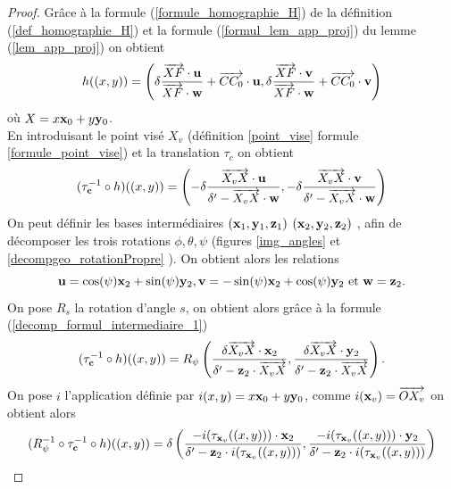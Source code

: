\begin{proof}
Grâce à la formule (\ref{formule_homographie_H}) de la définition (\ref{def_homographie_H}) et la formule  (\ref{formul_lem_app_proj}) du lemme (\ref{lem_app_proj}) on obtient
\begin{equation*}
h((x,y))=\left( \delta \frac{\overrightarrow{XF}\cdot \mathbf{u}}{\overrightarrow{XF} \cdot \mathbf{w}} +\overrightarrow{CC_0 } \cdot \mathbf{u}, \delta \frac{\overrightarrow{XF}\cdot \mathbf{v}}{\overrightarrow{XF} \cdot  \mathbf{w}}+\overrightarrow{CC_0 }\cdot \mathbf{v} \right)
\end{equation*}
où $X=x \mathbf{x}_0 + y \mathbf{y}_0 $.\\
En introduisant le point visé $X_v$ (définition \ref{point_vise} formule \ref{formule_point_vise}) et la translation $\tau_c$ on obtient 
\begin{equation}
(\tau_{\mathbf{c}}^{-1} \circ h)((x,y)) = \left ( -\delta \frac{\overrightarrow{X_vX}\cdot \mathbf{u}}{\delta' -\overrightarrow{X_vX} \cdot \mathbf{w}},-\delta \frac{\overrightarrow{X_vX}\cdot \mathbf{v}}{\delta' -\overrightarrow{X_vX} \cdot \mathbf{w}} \right)
\label{decomp_formul_intermediaire_1}
\end{equation}
On peut définir les bases intermédiaires $(\mathbf{x}_1 ,\mathbf{y}_1 ,\mathbf{z}_1)$  $(\mathbf{x}_2 ,\mathbf{y}_2 ,\mathbf{z}_2)$ , afin de décomposer les trois rotations $\phi,\theta,\psi$ (figures \ref{img_angles} et \ref{decompgeo_rotationPropre} ).
On obtient alors les relations
\begin{equation*}
\mathbf{u}=\cos(\psi)\mathbf{x}_{2}+\sin(\psi)\mathbf{y}_{2} , \mathbf{v}=-\sin(\psi)\mathbf{x}_{2}+\cos(\psi)\mathbf{y}_{2} \text{ et } \mathbf{w}=\mathbf{z}_2.
\end{equation*}
On pose $R_{s}$ la rotation d'angle $s$, on obtient alors grâce à la formule (\ref{decomp_formul_intermediaire_1}) 
\begin{equation*}
(\tau_{\mathbf{c}}^{-1} \circ h)((x,y)) = R_{\psi}\left(\frac{\delta \overrightarrow{X_v X}\cdot \mathbf{x}_{2} }{\delta'-\mathbf{z}_2 \cdot \overrightarrow{X_v X}},\frac{\delta \overrightarrow{X_v X}\cdot \mathbf{y}_{2}}{\delta'-\mathbf{z}_2 \cdot \overrightarrow{X_v X}}  \right).
\end{equation*}
On pose $i$ l'application définie par $i(x,y)=x \mathbf{x}_0 + y \mathbf{y}_0$, comme $i(\mathbf{x}_v)=\overrightarrow{O X_v}$ on obtient alors 
\begin{equation*}
(R_{\psi}^{-1} \circ \tau_{\mathbf{c}}^{-1}  \circ h)((x,y))=\delta \left(\frac{-i(\tau_{\mathbf{x}_v} ((x,y)))\cdot \mathbf{x}_{2} }{\delta'-\mathbf{z}_2 \cdot i(\tau_{\mathbf{x}_v} ((x,y)))},\frac{-i(\tau_{\mathbf{x}_v} ((x,y)))\cdot \mathbf{y}_{2}}{\delta'-\mathbf{z}_2 \cdot i(\tau_{\mathbf{x}_v} ((x,y)))}  \right) 
\end{equation*}


\end{proof}

